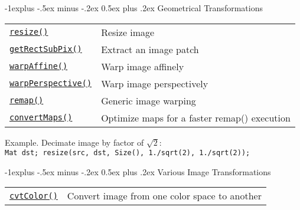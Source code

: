 \documentclass[10pt,landscape]{article}
\makeatletter
\renewcommand{\subsection}{\@startsection{subsection}{2}{0mm}%
                                {-1explus -.5ex minus -.2ex}%
                                {0.5ex plus .2ex}%
                                {\normalfont\normalsize\bfseries}}
\makeatother
\begin{document}
\begin{multicols}{3}
\subsection{Geometrical Transformations}

\begin{tabular}{@{}p{\the\MyLen}%
                @{}p{\linewidth-\the\MyLen}@{}}
\texttt{\href{http://opencv.itseez.com/modules/imgproc/doc/geometric_transformations.html\#resize}{resize()}} & Resize image \\

\texttt{\href{http://opencv.itseez.com/modules/imgproc/doc/geometric_transformations.html\#getrectsubpix}{getRectSubPix()}} & Extract an image patch \\

\texttt{\href{http://opencv.itseez.com/modules/imgproc/doc/geometric_transformations.html\#warpaffine}{warpAffine()}} & Warp image affinely\\

\texttt{\href{http://opencv.itseez.com/modules/imgproc/doc/geometric_transformations.html\#warpperspective}{warpPerspective()}} & Warp image perspectively\\

\texttt{\href{http://opencv.itseez.com/modules/imgproc/doc/geometric_transformations.html\#remap}{remap()}} & Generic image warping\\

\texttt{\href{http://opencv.itseez.com/modules/imgproc/doc/geometric_transformations.html\#convertmaps}{convertMaps()}} & Optimize maps for a faster remap() execution\\

\end{tabular}

\begin{tabbing}
Example. Decimate image by factor of $\sqrt{2}$:\\
\texttt{Mat dst; resize(src, dst, Size(), 1./sqrt(2), 1./sqrt(2));}
\end{tabbing}

\subsection{Various Image Transformations}

\begin{tabular}{@{}p{\the\MyLen}%
                @{}p{\linewidth-\the\MyLen}@{}}

\texttt{\href{http://opencv.itseez.com/modules/imgproc/doc/miscellaneous_transformations.html\#cvtcolor}{cvtColor()}} & Convert image from one color space to another \\


\end{tabular}
\end{multicols}
\end{document}
